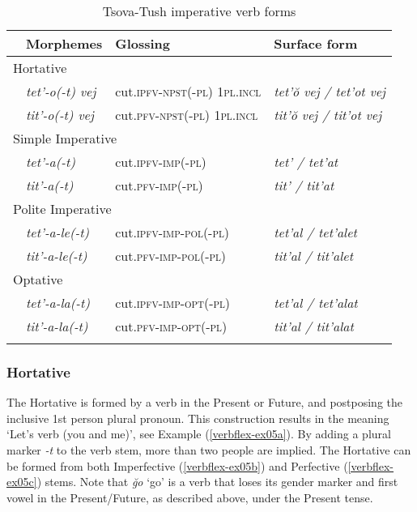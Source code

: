 \begin{table}[h]
\begin{tabular}{llll}
\lsptoprule
	& Morphemes & {Glossing} & {Surface form} \\\midrule
	\multicolumn{4}{l}{Hortative} \\
	  & \textit{tet'-o(-t) vej} & cut.\textsc{ipfv-npst(-pl) 1pl.incl} & \textit{tet'\u{o} vej / tet'ot vej} \\
	  & \textit{tit'-o(-t) vej} & cut.\textsc{pfv-npst(-pl) 1pl.incl} & \textit{tit'\u{o} vej / tit'ot vej} \\
\midrule
	\multicolumn{4}{l}{Simple Imperative} \\
	 & \textit{tet'-a(-t)} & cut.\textsc{ipfv-imp(-pl)} & \textit{tet' / tet'at} \\
	 & \textit{tit'-a(-t)} & cut.\textsc{pfv-imp(-pl)} & \textit{tit' / tit'at} \\
	\multicolumn{4}{l}{Polite Imperative} \\
	 & \textit{tet'-a-le(-t)} & cut.\textsc{ipfv-imp-pol(-pl)} & \textit{tet'al / tet'alet} \\
	 & \textit{tit'-a-le(-t)} & cut.\textsc{pfv-imp-pol(-pl)} & \textit{tit'al / tit'alet} \\
	\multicolumn{4}{l}{Optative} \\
	 & \textit{tet'-a-la(-t)} & cut.\textsc{ipfv-imp-opt(-pl)} & \textit{tet'al / tet'alat} \\
	 & \textit{tit'-a-la(-t)} & cut.\textsc{pfv-imp-opt(-pl)} & \textit{tit'al / tit'alat} \\
\lspbottomrule
\end{tabular}
\caption{Tsova-Tush imperative verb forms}
\label{table-impverbflex}
\end{table}



\subsubsection{Hortative}

The Hortative is formed by a verb in the Present or Future, and postposing the inclusive 1st person plural pronoun. This construction results in the meaning `Let's verb (you and me)', see Example (\ref{verbflex-ex05a}). By adding a plural marker \textit{-t} to the verb stem, more than two people are implied. The Hortative can be formed from both Imperfective (\ref{verbflex-ex05b}) and Perfective (\ref{verbflex-ex05c}) stems. Note that \textit{\u{go}} `go' is a verb that loses its gender marker and first vowel in the Present/Future, as described above, under the Present tense.

